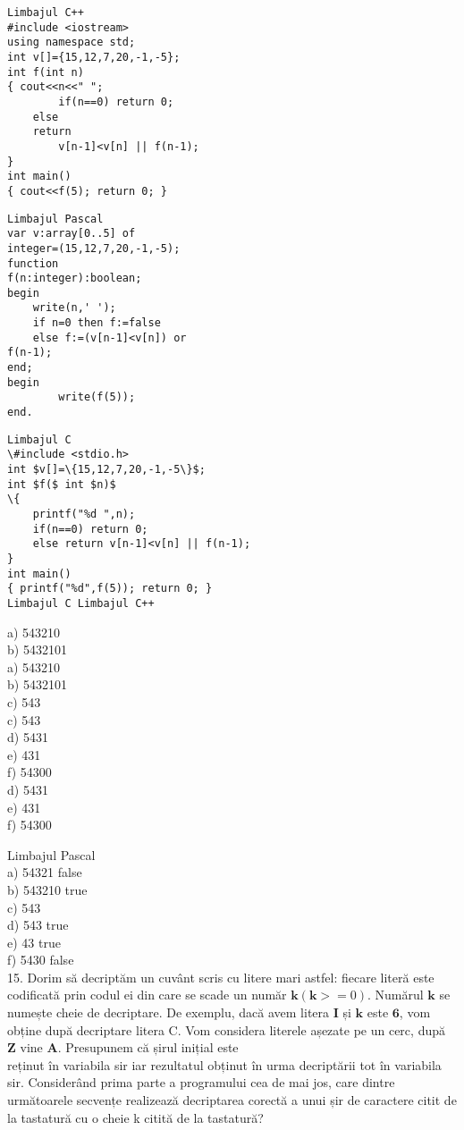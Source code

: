 \begin{verbatim}
Limbajul C++
#include <iostream>
using namespace std;
int v[]={15,12,7,20,-1,-5};
int f(int n)
{ cout<<n<<" ";
        if(n==0) return 0;
    else
    return
        v[n-1]<v[n] || f(n-1);
}
int main()
{ cout<<f(5); return 0; }
\end{verbatim}

\begin{verbatim}
Limbajul Pascal
var v:array[0..5] of
integer=(15,12,7,20,-1,-5);
function
f(n:integer):boolean;
begin
    write(n,' ');
    if n=0 then f:=false
    else f:=(v[n-1]<v[n]) or
f(n-1);
end;
begin
        write(f(5));
end.
\end{verbatim}

\begin{verbatim}
Limbajul C
\#include <stdio.h>
int $v[]=\{15,12,7,20,-1,-5\}$;
int $f($ int $n)$
\{
    printf("%d ",n);
    if(n==0) return 0;
    else return v[n-1]<v[n] || f(n-1);
}
int main()
{ printf("%d",f(5)); return 0; }
Limbajul C Limbajul C++
\end{verbatim}

a) 543210\\
b) 5432101\\
a) 543210\\
b) 5432101\\
c) 543\\
c) 543\\
d) 5431\\
e) 431\\
f) 54300\\
d) 5431\\
e) 431\\
f) 54300

Limbajul Pascal\\
a) 54321 false\\
b) 543210 true\\
c) 543\\
d) 543 true\\
e) 43 true\\
f) 5430 false\\
15. Dorim să decriptăm un cuvânt scris cu litere mari astfel: fiecare literă este codificată prin codul ei din care se scade un număr $\mathbf{k}(\mathbf{k}>=0)$. Numărul $\mathbf{k}$ se numește cheie de decriptare. De exemplu, dacă avem litera $\mathbf{I}$ și $\mathbf{k}$ este $\mathbf{6}$, vom obține după decriptare litera C. Vom considera literele așezate pe un cerc, după $\mathbf{Z}$ vine $\mathbf{A}$. Presupunem că șirul inițial este\\
reținut în variabila sir iar rezultatul obținut în urma decriptării tot în variabila sir. Considerând prima parte a programului cea de mai jos, care dintre următoarele secvențe realizează decriptarea corectă a unui șir de caractere citit de la tastatură cu o cheie k citită de la tastatură?

